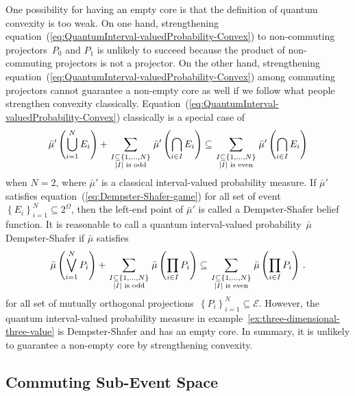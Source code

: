 \documentclass[12pt]{iopart}
\theoremstyle{plain}
\theoremstyle{definition}
\theoremstyle{remark}
\newcommand{\events}{\ensuremath{\mathcal{E}}}
\begin{document}
One possibility for having an empty core is that the definition of
quantum convexity is too weak. On one hand, strengthening equation~(\ref{eq:QuantumInterval-valuedProbability-Convex})
to non-commuting projectors~$P_{0}$ and $P_{1}$ is unlikely to
succeed because the product of non-commuting projectors is not a projector.
On the other hand, strengthening equation~(\ref{eq:QuantumInterval-valuedProbability-Convex})
among commuting projectors cannot guarantee a non-empty core as well
if we follow what people strengthen convexity classically. Equation~(\ref{eq:QuantumInterval-valuedProbability-Convex})
classically is a special case of 
\begin{equation}
\bar{\mu}'\left(\bigcup_{i=1}^{N}E_{i}\right)+\sum_{{{\scriptstyle I\subseteq\left\{ 1,\ldots,N\right\} }\atop {\scriptstyle \left|I\right|\textrm{ is odd}}}}\bar{\mu}'\left(\bigcap_{i\in I}E_{i}\right)\subseteq\sum_{{{\scriptstyle I\subseteq\left\{ 1,\ldots,N\right\} }\atop {\scriptstyle \left|I\right|\textrm{ is even}}}}\bar{\mu}'\left(\bigcap_{i\in I}E_{i}\right)\label{eq:Dempster-Shafer-game}
\end{equation}
when $N=2$, where $\bar{\mu}'$ is a classical interval-valued probability
measure. If $\bar{\mu}'$ satisfies equation~(\ref{eq:Dempster-Shafer-game})
for all set of event~$\left\{ E_{i}\right\} _{i=1}^{N}\subseteq2^{\Omega}$,
then the left-end point of $\bar{\mu}'$ is called a Dempster-Shafer
belief function. It is reasonable to call a quantum interval-valued
probability~$\bar{\mu}$ Dempster-Shafer if $\bar{\mu}$ satisfies
\begin{equation}
\bar{\mu}\left(\bigvee_{i=1}^{N}P_{i}\right)+\sum_{{{\scriptstyle I\subseteq\left\{ 1,\ldots,N\right\} }\atop {\scriptstyle \left|I\right|\textrm{ is odd}}}}\bar{\mu}\left(\prod_{i\in I}P_{i}\right)\subseteq\sum_{{{\scriptstyle I\subseteq\left\{ 1,\ldots,N\right\} }\atop {\scriptstyle \left|I\right|\textrm{ is even}}}}\bar{\mu}\left(\prod_{i\in I}P_{i}\right)\,.\label{eq:Dempster-Shafer-game-quantum}
\end{equation}
for all set of mutually orthogonal projections~$\left\{ P_{i}\right\} _{i=1}^{N}\subseteq\events$.
However, the quantum interval-valued probability measure in example~\ref{ex:three-dimensional-three-value}
is Dempster-Shafer and has an empty core. In summary, it is unlikely
to guarantee a non-empty core by strengthening convexity.

\subsection{Commuting Sub-Event Space}
\end{document}
